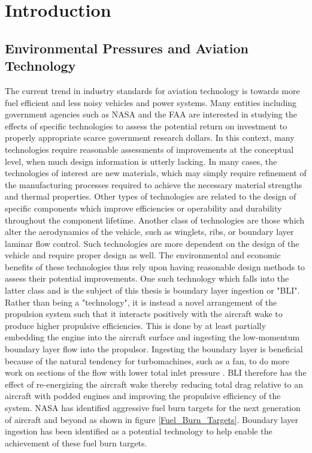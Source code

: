\chapter{Introduction}

\section{Environmental Pressures and Aviation Technology}
\indent The current trend in industry standards for aviation technology is towards more fuel efficient and less noisy vehicles and power systems. Many entities including government agencies such as NASA and the FAA are interested in studying the effects of specific technologies to assess the potential return on investment to properly appropriate scarce government research dollars. In this context, many technologies require reasonable assessments of improvements at the conceptual level, when much design information is utterly lacking.  In many cases, the technologies of interest are new materials, which may simply require refinement of the manufacturing processes required to achieve the necessary material strengths and thermal properties. Other types of technologies are related to the design of specific components which improve efficiencies or operability and durability throughout the component lifetime. Another class of technologies are those which alter the aerodynamics of the vehicle, such as winglets, ribs, or boundary layer laminar flow control.  Such technologies are more dependent on the design of the vehicle and require proper design as well. The environmental and economic benefits of these technologies thus rely upon having reasonable design methods to assess their potential improvements.  One such technology which falls into the latter class and is the subject of this thesis is boundary layer ingestion or "BLI". Rather than being a "technology", it is instead a novel arrangement of the propulsion system such that it interacts positively with the aircraft wake to produce higher propulsive efficiencies. This is done by at least partially embedding the engine into the aircraft surface and ingesting the low-momentum boundary layer flow into the propulsor. Ingesting the boundary layer is beneficial because of the natural tendency for turbomachines, such as a fan, to do more work on sections of the flow with lower total inlet pressure \cite{Smith1993}.  BLI therefore has the effect of re-energizing the aircraft wake thereby reducing total drag relative to an aircraft with podded engines and improving the propulsive efficiency of the system.  NASA has identified aggressive fuel burn targets for the next generation of aircraft and beyond as shown in figure \ref{Fuel_Burn_Targets}.  Boundary layer ingestion has been identified as a potential technology to help enable the achievement of these fuel burn targets.  

